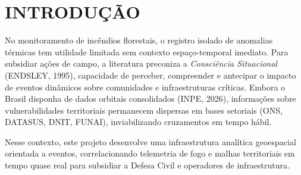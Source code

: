 \section*{INTRODUÇÃO}

No monitoramento de incêndios florestais, o registro isolado de anomalias térmicas tem utilidade limitada sem contexto espaço-temporal imediato. Para subsidiar ações de campo, a literatura preconiza a \textit{Consciência Situacional} (ENDSLEY, 1995), capacidade de perceber, compreender e antecipar o impacto de eventos dinâmicos sobre comunidades e infraestruturas críticas. Embora o Brasil disponha de dados orbitais consolidados (INPE, 2026), informações sobre vulnerabilidades territoriais permanecem dispersas em bases setoriais (ONS, DATASUS, DNIT, FUNAI), inviabilizando cruzamentos em tempo hábil.

Nesse contexto, este projeto desenvolve uma infraestrutura analítica geoespacial orientada a eventos, correlacionando telemetria de fogo e malhas territoriais em tempo quase real para subsidiar a Defesa Civil e operadores de infraestrutura.


